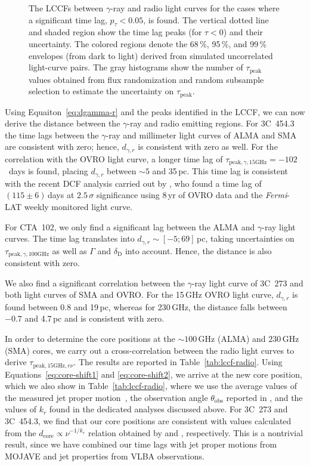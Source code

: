 \documentclass[twocolumn]{aastex62}
\newcommand{\gray}{$\gamma$-ray\xspace}
\newcommand{\fermiLAT}{\emph{Fermi}-LAT\xspace}
\begin{document}
\begin{figure}
    \caption{The LCCFs between \gray and radio light curves for the cases where a significant time lag, $p_\tau < 0.05$, is found. The vertical dotted line and shaded region show the time lag peaks (for $\tau < 0$) and their uncertainty. 
    The colored regions denote the 68\,\%, 95\,\%, and 99\,\% envelopes (from dark to light) derived from simulated uncorrelated light-curve pairs. 
    The gray histograms show the number of $\tau_\mathrm{peak}$ values obtained from flux randomization and random subsample selection to estimate the uncertainty on $\tau_\mathrm{peak}$.}
    \label{fig:lccf}
\end{figure}

Using Equaiton~\ref{eq:dgamma-r} and the peaks identified in the LCCF, we can now derive the distance between the \gray and radio emitting regions. 
For 3C~454.3 the time lags between the \gray and millimeter light curves of ALMA and SMA are consistent with zero; hence, $d_{\gamma,r}$ is consistent with zero as well.
For the correlation with the OVRO light curve, a longer time lag of $\tau_{\mathrm{peak},\gamma,15\mathrm{GHz}} = -102$~days is found, placing $d_{\gamma,r}$ between $\sim 5$ and 35\,pc.
This time lag is consistent with the recent DCF analysis carried out by \citet{2018MNRAS.480.5517L}, who found a time lag of $(115\pm6)$\,days at $2.5\,\sigma$ significance using 8\,yr of OVRO data and the \fermiLAT weekly monitored light curve. 

For CTA~102, we only find a significant lag between the ALMA and \gray light curves. 
The time lag translates into $d_{\gamma,r} \sim [-5;69]\,$pc, taking uncertainties on $\tau_{\mathrm{peak},\gamma,100\mathrm{GHz}}$ as well as $\Gamma$ and $\delta_\mathrm{D}$ into account.
Hence, the distance is also consistent with zero. 

We also find a significant correlation between the \gray light curve of 3C~273 and both light curves of SMA and OVRO. 
For the 15\,GHz OVRO light curve, $d_{\gamma,r}$ is found between 0.8 and 19\,pc, whereas for 230\,GHz, the distance falls between $-0.7$ and 4.7\,pc and is consistent with zero. 

In order to determine the core positions at the $\sim100$\,GHz (ALMA) and $230\,$GHz (SMA) cores, we carry out a cross-correlation between the radio light curves to derive $\tau_{\mathrm{peak},15\mathrm{GHz},r\nu}$.
The results are reported in Table~\ref{tab:lccf-radio}.
Using Equations~\ref{eq:core-shift1} and \ref{eq:core-shift2}, we arrive at the new core position, which we also show in Table~\ref{tab:lccf-radio}, where we use the average values of the measured jet proper motion~\citep[see Table 4 in][]{2016AJ....152...12L}, the observation angle $\theta_\mathrm{obs}$ reported in \citet{2017ApJ...846...98J},
and the values of $k_r$ found in the dedicated analyses discussed above. 
For 3C~273 and 3C~454.3, we find that our core positions are consistent with values calculated from the $d_\mathrm{core}\propto\nu^{-1/k_r}$ relation obtained by \citet{2013ARep...57...34V} and \citet{2014MNRAS.437.3396K}, respectively. 
This is a nontrivial result, since we have combined our time lags with jet proper motions from MOJAVE and jet properties from VLBA observations. 
\end{document}
